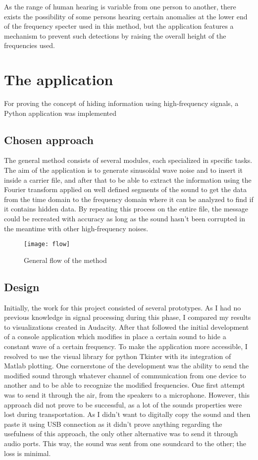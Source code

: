 \documentclass[12pt]{report}
\begin{document}
As the range of human hearing is variable from one person to another, there exists the possibility of some persons hearing certain anomalies at the lower end of the frequency specter used in this method, but the application features a mechanism to prevent such detections by raising the overall height of the frequencies used.

\chapter{The application}
For proving the concept of hiding information using high-frequency signals, a Python application was implemented
\section{Chosen approach}
The general method consists of several modules, each specialized in specific tasks. The aim of the application is to generate sinusoidal wave noise and to insert it inside a carrier file, and after that to be able to extract the information using the Fourier transform applied on well defined segments of the sound to get the data from the time domain to the frequency domain where it can be analyzed to find if it contains hidden data. By repeating this process on the entire file, the message could be recreated with accuracy as long as the sound hasn't been corrupted in the meantime with other high-frequency noises.


\begin{figure}[h!]
\centering
\texttt{[image: flow]}
\caption{General flow of the method}
\label{fig:flow}
\end{figure}

\section{Design}
Initially, the work for this project consisted of several prototypes. As I had no previous knowledge in signal processing during this phase, I compared my results to visualizations created in Audacity. After that followed the initial development of a console application which modifies in place a certain sound to hide a constant wave of a certain frequency. To make the application more accessible, I resolved to use the visual library for python Tkinter with its integration of Matlab plotting. One cornerstone of the development was the ability to send the modified sound through whatever channel of communication from one device to another and to be able to recognize the modified frequencies. One first attempt was to send it through the air, from the speakers to a microphone. However, this approach did not prove to be successful, as a lot of the sounds properties were lost during transportation. As I didn't want to digitally copy the sound and then paste it using USB connection as it didn't prove anything regarding the usefulness of this approach, the only other alternative was to send it through audio ports. This way, the sound was sent from one soundcard to the other; the loss is minimal.
\end{document}
